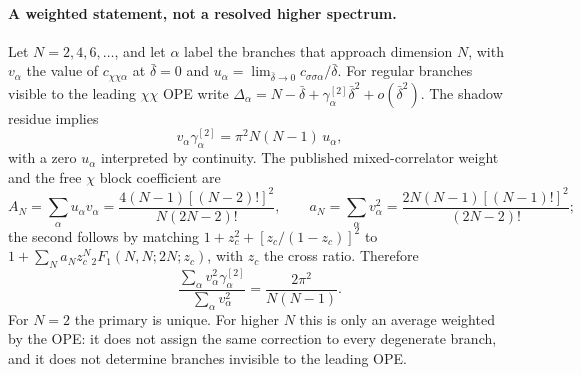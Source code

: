 \documentclass[11pt,a4paper]{article}
\numberwithin{equation}{section}
\newcommand{\db}{\bar\delta}
\begin{document}
\paragraph{A weighted statement, not a resolved higher spectrum.} Let $N=2,4,6,\ldots$, and let $\alpha$ label the
branches that approach dimension $N$, with $v_\alpha$ the value of $c_{\chi\chi\alpha}$ at $\db=0$ and
$u_\alpha=\lim_{\db\to0}c_{\sigma\sigma\alpha}/\db$. For regular branches visible to the leading $\chi\chi$ OPE write
$\Delta_\alpha=N-\db+\gamma^{[2]}_\alpha\db^2+o(\db^2)$. The shadow residue implies
\begin{equation}
 v_\alpha\gamma^{[2]}_\alpha=\pi^2N(N-1)\,u_\alpha,
\end{equation}
with a zero $u_\alpha$ interpreted by continuity. The published mixed-correlator weight and the free $\chi$ block
coefficient are
\begin{equation}
 A_N=\sum_\alpha u_\alpha v_\alpha=\frac{4(N-1)[(N-2)!]^2}{N(2N-2)!},\qquad
 a_N=\sum_\alpha v_\alpha^2=\frac{2N(N-1)[(N-1)!]^2}{(2N-2)!};
\end{equation}
the second follows by matching $1+z_c^2+[z_c/(1-z_c)]^2$ to $1+\sum_Na_Nz_c^N{}_2F_1(N,N;2N;z_c)$, with $z_c$ the cross
ratio. Therefore
\begin{equation}
 \frac{\sum_\alpha v_\alpha^2\gamma^{[2]}_\alpha}{\sum_\alpha v_\alpha^2}=\frac{2\pi^2}{N(N-1)} .
\end{equation}
For $N=2$ the primary is unique. For higher $N$ this is only an average weighted by the OPE: it does not assign the
same correction to every degenerate branch, and it does not determine branches invisible to the leading OPE.

\end{document}
